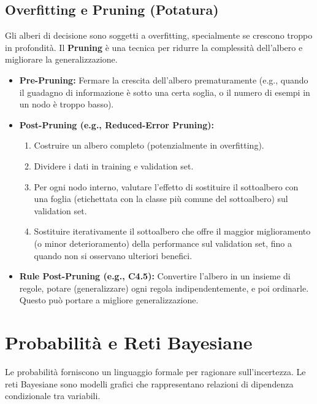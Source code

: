 \documentclass[a4paper,11pt]{article}
\begin{document}
\subsection{Overfitting e Pruning (Potatura)}
Gli alberi di decisione sono soggetti a overfitting, specialmente se crescono troppo in profondità. Il \textbf{Pruning} è una tecnica per ridurre la complessità dell'albero e migliorare la generalizzazione.
\begin{itemize}
    \item \textbf{Pre-Pruning:} Fermare la crescita dell'albero prematuramente (e.g., quando il guadagno di informazione è sotto una certa soglia, o il numero di esempi in un nodo è troppo basso).
    \item \textbf{Post-Pruning (e.g., Reduced-Error Pruning):}
    \begin{enumerate}
        \item Costruire un albero completo (potenzialmente in overfitting).
        \item Dividere i dati in training e validation set.
        \item Per ogni nodo interno, valutare l'effetto di sostituire il sottoalbero con una foglia (etichettata con la classe più comune del sottoalbero) sul validation set.
        \item Sostituire iterativamente il sottoalbero che offre il maggior miglioramento (o minor deterioramento) della performance sul validation set, fino a quando non si osservano ulteriori benefici.
    \end{enumerate}
    \item \textbf{Rule Post-Pruning (e.g., C4.5):} Convertire l'albero in un insieme di regole, potare (generalizzare) ogni regola indipendentemente, e poi ordinarle. Questo può portare a migliore generalizzazione.
\end{itemize}

\section{Probabilità e Reti Bayesiane}

Le probabilità forniscono un linguaggio formale per ragionare sull'incertezza. Le reti Bayesiane sono modelli grafici che rappresentano relazioni di dipendenza condizionale tra variabili.
\end{document}
